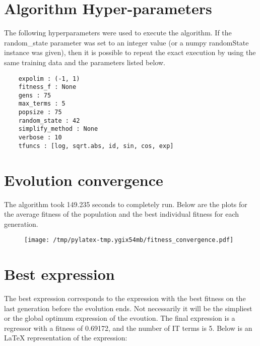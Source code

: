 \documentclass{article}%
\begin{document}
%
\vfill \pagebreak

%
\section*{Algorithm Hyper-parameters}%
\label{sec:AlgorithmHyper{-}parameters}%

                The following hyperparameters were used to execute the
                algorithm. If the random\_state parameter was set to an 
                integer value (or a numpy randomState instance was given), then
                it is possible to repeat the exact execution by using the same
                training data and the parameters listed below.%
{\footnotesize \begin{verbatim}    expolim : (-1, 1)
    fitness_f : None
    gens : 75
    max_terms : 5
    popsize : 75
    random_state : 42
    simplify_method : None
    verbose : 10
    tfuncs : [log, sqrt.abs, id, sin, cos, exp]\end{verbatim} } \vfill \pagebreak

%

            \chead{}
            \rhead{\today, \currenttime}
            
            \lfoot{}
            \cfoot{}
            \rfoot{\thepage\ | \pageref{LastPage}}
\section*{Evolution convergence}%
\label{sec:Evolutionconvergence}%

                The algorithm took 149.235 seconds to
                completely run. Below are the plots for the average fitness
                of the population and the best individual fitness for each
                generation.\vfill%


\begin{figure}[H]%
\centering%
\texttt{[image: /tmp/pylatex-tmp.ygix54mb/fitness\_convergence.pdf]}%
\end{figure}

%
\vfill \pagebreak

%
\section*{Best expression}%
\label{sec:Bestexpression}%

                The best expression corresponds to the expression with
                the best fitness on the last generation before the evolution
                ends. Not necessarily it will be the simpliest or the global
                optimum expression of the evoution. The final expression is a regressor with a fitness of
                0.69172, and the number of IT terms is
                5. Below is an LaTeX representation
                of the expression:
                
\end{document}
